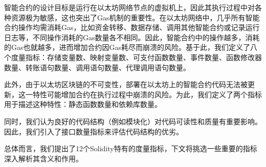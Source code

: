 智能合约的设计目标是运行在以太坊网络节点的虚拟机上，因此其执行过程中对各种资源极为敏感，这也突出了Gas机制的重要性。在以太坊网络中，几乎所有智能合约操作均需消耗Gas，比如资金转移、数据存储、调用其他智能合约或记录运行日志等，不同操作消耗的Gas数量各不相同。因此，智能合约中的操作越多，消耗的Gas也就越多，进而增加合约因Gas耗尽而崩溃的风险\cite{qianpeng2022zh}。基于此，我们定义了八个度量指标：存储变量数、映射变量数、可支付函数数量、事件数量、函数修改器数量、转账语句数量、调用语句数量、代理调用语句数量。

此外，由于以太坊区块链的不可变性，部署在以太坊上的智能合约代码无法被更新，这一特性可能增加合约在执行过程中崩溃的风险。为此，我们定义了两个指标用于描述这种特性：静态函数数量和依赖库数量。

同时，我们认为良好的代码结构（例如模块化）对代码可读性和质量有重要影响。因此，我们引入了接口数量指标来评估代码结构的优劣。

总体而言，我们提出了12个Solidity特有的度量指标，下文将挑选一些重要的指标深入解析其含义和作用。

